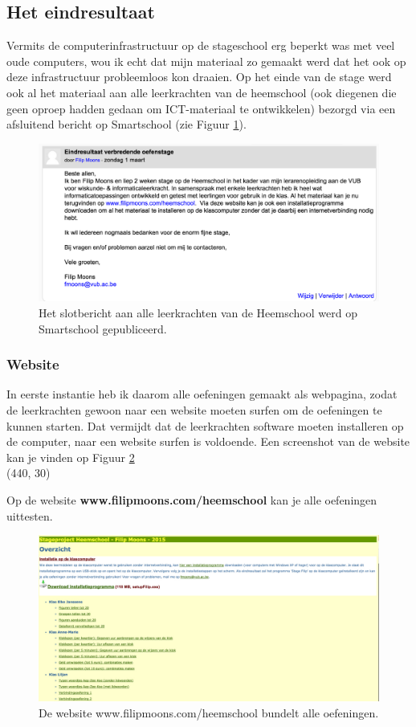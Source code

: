 \documentclass[a4paper,11pt]{article}
\theoremstyle{definition}
\begin{document}
\subsection{Het eindresultaat}
Vermits de computerinfrastructuur op de stageschool erg beperkt was met veel oude computers, wou ik echt dat mijn materiaal 
zo gemaakt werd dat het ook op deze infrastructuur probleemloos kon draaien. Op 
het einde van de stage werd ook al het materiaal aan alle leerkrachten van de 
heemschool (ook diegenen die geen oproep hadden gedaan om ICT-materiaal te ontwikkelen) 
bezorgd via een afsluitend bericht op Smartschool (zie Figuur \ref{einde}).
\begin{figure}
  \centering
  \includegraphics[scale=0.27]{eindoproep.jpg}\caption{Het slotbericht aan alle leerkrachten van de Heemschool werd op Smartschool gepubliceerd.}\label{einde}
\end{figure}

\subsubsection{Website}
In eerste instantie heb ik daarom alle oefeningen gemaakt als webpagina, zodat de leerkrachten 
gewoon naar een website moeten surfen om de oefeningen te kunnen starten. Dat 
vermijdt dat de leerkrachten software moeten installeren op de computer, naar 
een website surfen is voldoende. Een screenshot van de website kan je vinden op Figuur \ref{website}\\

\noindent\framebox(440, 30){ 
\parbox{430\unitlength}{\centering Op de website \textbf{www.filipmoons.com/heemschool} kan je alle oefeningen uittesten.}
}

 \begin{figure}[h!]
  \centering
  \includegraphics[scale=0.25]{website.jpg}\caption{De website www.filipmoons.com/heemschool bundelt alle oefeningen.}\label{website}
\end{figure}
\end{document}
